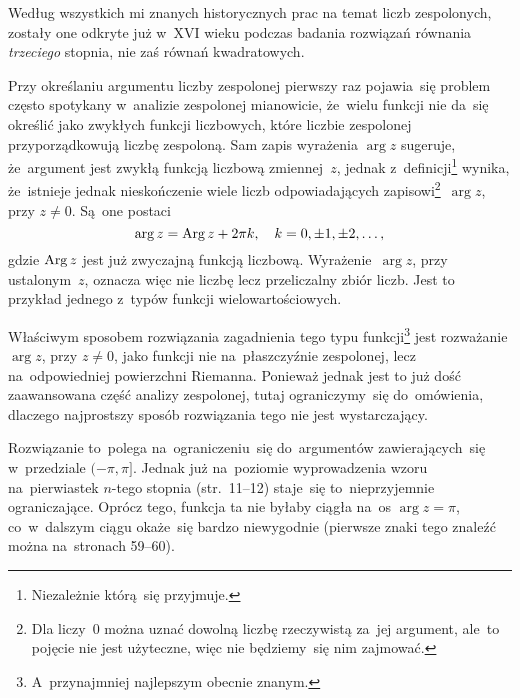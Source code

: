 \documentclass[a4paper,11pt]{article}
\begin{document}
\vspace{\spaceFour}



\start {} Według wszystkich mi znanych historycznych prac na
temat liczb zespolonych, zostały one odkryte już w~XVI wieku podczas
badania rozwiązań równania \textit{trzeciego} stopnia, nie zaś równań
kwadratowych. 

\vspace{\spaceFour}



\start {} Przy określaniu argumentu liczby zespolonej pierwszy
raz pojawia~się problem często spotykany w~analizie zespolonej
mianowicie, że~wielu funkcji nie da~się określić jako zwykłych funkcji
liczbowych, które liczbie zespolonej przyporządkowują liczbę
zespoloną. Sam zapis wyrażenia $\arg z$ sugeruje, że~argument jest
zwykłą funkcją liczbową zmiennej~$z$, jednak
z~definicji\footnote{Niezależnie którą~się przyjmuje.} wynika,
że~istnieje jednak nieskończenie wiele liczb odpowiadających
zapisowi\footnote{Dla liczy~$0$ można uznać
  dowolną liczbę rzeczywistą za~jej argument, ale~to pojęcie nie jest
  użyteczne, więc nie będziemy~się nim zajmować.}~$\arg z$, przy $z \neq 0$. Są~one postaci
\begin{equation}
  \label{eq:Leja-07}
  \arg z = \operatorname{Arg} z + 2\pi k, \quad k = 0, \pm 1, \pm 2, \ldots,
\end{equation}
gdzie $\operatorname{Arg} z$ jest już zwyczajną funkcją liczbową.
Wyrażenie~$\arg z$, przy ustalonym~$z$, oznacza więc nie liczbę lecz
przeliczalny zbiór liczb. Jest to przykład jednego z~typów funkcji
wielowartościowych.

Właściwym sposobem rozwiązania zagadnienia tego typu
funkcji\footnote{A~przynajmniej najlepszym obecnie znanym.} jest
rozważanie $\arg z$, przy $z \neq 0$, jako funkcji nie na~płaszczyźnie
zespolonej, lecz na~odpowiedniej powierzchni Riemanna. Ponieważ jednak
jest to już dość zaawansowana część analizy zespolonej, tutaj
ograniczymy~się do~omówienia, dlaczego najprostszy sposób rozwiązania
tego nie jest wystarczający.

Rozwiązanie to~polega na~ograniczeniu~się do~argumentów
zawierających~się w~przedziale $( -\pi, \pi ]$. Jednak już na~poziomie
wyprowadzenia wzoru na~pierwiastek $n$-tego stopnia (str.~11--12)
staje~się to~nieprzyjemnie ograniczające. Oprócz tego, funkcja ta nie
byłaby ciągła na~os $\arg z = \pi$, co~w~dalszym ciągu okaże~się
bardzo niewygodnie (pierwsze znaki tego znaleźć można na~stronach
59--60).
\end{document}
